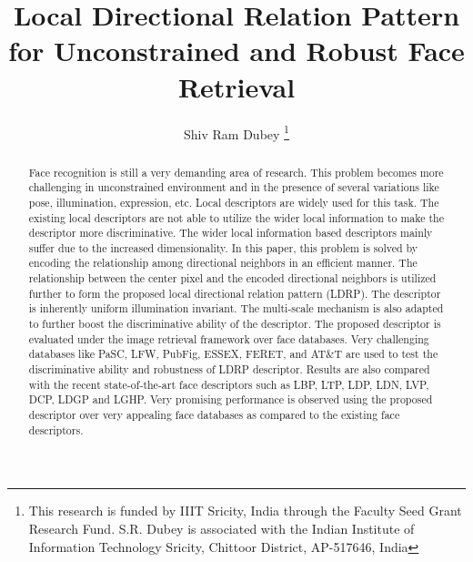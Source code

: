 \documentclass[a4paper]{article}
\begin{document}
\title{Local Directional Relation Pattern for Unconstrained and Robust Face Retrieval}

\author{Shiv Ram Dubey%
\thanks{
This research is funded by IIIT Sricity, India through the Faculty Seed Grant Research Fund. S.R. Dubey is associated with the Indian Institute of Information Technology Sricity, Chittoor District, AP-517646, India 
}%
}

\maketitle

\begin{abstract}
Face recognition is still a very demanding area of research. This problem becomes more challenging in unconstrained environment and in the presence of several variations like pose, illumination, expression, etc. Local descriptors are widely used for this task. The existing local descriptors are not able to utilize the wider local information to make the descriptor more discriminative. The wider local information based descriptors mainly suffer due to the increased dimensionality. In this paper, this problem is solved by encoding the relationship among directional neighbors in an efficient manner. The relationship between the center pixel and the encoded directional neighbors is utilized further to form the proposed local directional relation pattern (LDRP). The descriptor is inherently uniform illumination invariant. The multi-scale mechanism is also adapted to further boost the discriminative ability of the descriptor. The proposed descriptor is evaluated under the image retrieval framework over face databases. Very challenging databases like PaSC, LFW, PubFig, ESSEX, FERET, and AT\&T are used to test the discriminative ability and robustness of LDRP descriptor. Results are also compared with the recent state-of-the-art face descriptors such as LBP, LTP, LDP, LDN, LVP, DCP, LDGP and LGHP. Very promising performance is observed using the proposed descriptor over very appealing face databases as compared to the existing face descriptors.
\end{abstract}

\end{document}
